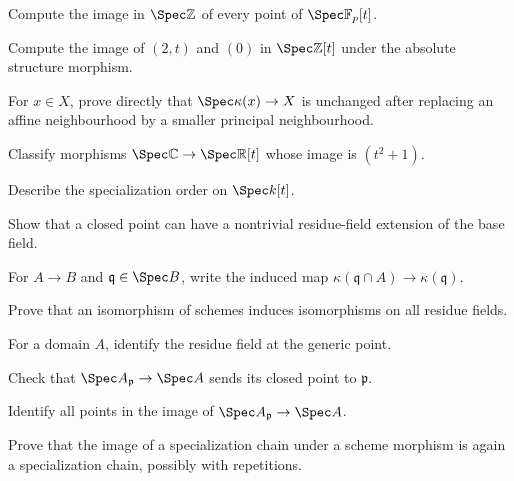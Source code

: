 \begin{exercise}\label{exer:vi21-e01}
Compute the image in $\Spec\mathbb Z$ of every point of $\Spec\mathbb F_p[t]$.
\end{exercise}
\begin{exercise}\label{exer:vi21-e02}
Compute the image of $(2,t)$ and $(0)$ in $\Spec\mathbb Z[t]$ under the absolute structure morphism.
\end{exercise}
\begin{exercise}\label{exer:vi21-e03}
For $x\in X$, prove directly that $\Spec\kappa(x)\to X$ is unchanged after replacing an affine neighbourhood by a smaller principal neighbourhood.
\end{exercise}
\begin{exercise}\label{exer:vi21-e04}
Classify morphisms $\Spec\mathbb C\to\Spec\mathbb R[t]$ whose image is $(t^2+1)$.
\end{exercise}
\begin{exercise}\label{exer:vi21-e05}
Describe the specialization order on $\Spec k[t]$.
\end{exercise}
\begin{exercise}\label{exer:vi21-e06}
Show that a closed point can have a nontrivial residue-field extension of the base field.
\end{exercise}
\begin{exercise}\label{exer:vi21-e07}
For $A\to B$ and $\mathfrak q\in\Spec B$, write the induced map $\kappa(\mathfrak q\cap A)\to\kappa(\mathfrak q)$.
\end{exercise}
\begin{exercise}\label{exer:vi21-e08}
Prove that an isomorphism of schemes induces isomorphisms on all residue fields.
\end{exercise}
\begin{exercise}\label{exer:vi21-e09}
For a domain $A$, identify the residue field at the generic point.
\end{exercise}
\begin{exercise}\label{exer:vi21-e10}
Check that $\Spec A_{\mathfrak p}\to\Spec A$ sends its closed point to $\mathfrak p$.
\end{exercise}
\begin{exercise}\label{exer:vi21-e11}
Identify all points in the image of $\Spec A_{\mathfrak p}\to\Spec A$.
\end{exercise}
\begin{exercise}\label{exer:vi21-e12}
Prove that the image of a specialization chain under a scheme morphism is again a specialization chain, possibly with repetitions.
\end{exercise}
